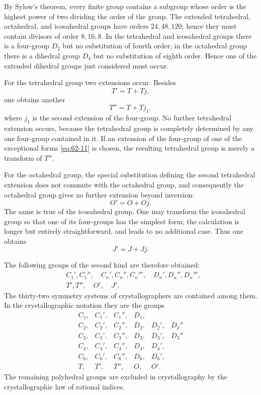 \documentclass[11pt]{article}
\begin{document}
By Sylow's theorem, every finite group contains a subgroup whose order is the highest power of two dividing the order of the group.  The extended tetrahedral, octahedral, and icosahedral groups have orders \(24,48,120\); hence they must contain divisors of order \(8,16,8\).  In the tetrahedral and icosahedral groups there is a four-group \(D_2\) but no substitution of fourth order; in the octahedral group there is a dihedral group \(D_4\) but no substitution of eighth order.  Hence one of the extended dihedral groups just considered must occur.

For the tetrahedral group two extensions occur.  Besides
\[
 T'=T+Tj,
\]
one obtains another
\[
 T''=T+Tj_1,
\]
where \(j_1\) is the second extension of the four-group.  No further tetrahedral extension occurs, because the tetrahedral group is completely determined by any one four-group contained in it.  If an extension of the four-group of one of the exceptional forms \eqref{eq:62-11} is chosen, the resulting tetrahedral group is merely a transform of \(T''\).

For the octahedral group, the special substitution defining the second tetrahedral extension does not commute with the octahedral group, and consequently the octahedral group gives no further extension beyond inversion:
\[
 O'=O+Oj.
\]
The same is true of the icosahedral group.  One may transform the icosahedral group so that one of its four-groups has the simplest form; the calculation is longer but entirely straightforward, and leads to no additional case.  Thus one obtains
\[
 J'=J+Jj.
\]

The following groups of the second kind are therefore obtained:
\begin{align*}
& C_1',C_1'',\quad C_n',C_n'',C_n''',\quad D_n',D_n'',D_n''',\\
& T',T'',\quad O',\quad J'.
\end{align*}
The thirty-two symmetry systems of crystallographers are contained among them.  In the crystallographic notation they are the groups
\[
\begin{array}{llllll}
 C_1, & C_1', & C_1'', & D_1, & & \\
 C_2, & C_2', & C_2'', & D_2, & D_2', & D_2'' \\
 C_3, & C_3', & C_3'', & D_3, & D_3', & D_3'' \\
 C_4, & C_4', & C_4'', & D_4, & D_4', & \\
 C_6, & C_6', & C_6'', & D_6, & D_6', & \\
 T, & T', & T'', & O, & O'. &
\end{array}
\]
The remaining polyhedral groups are excluded in crystallography by the crystallographic law of rational indices.
\end{document}
